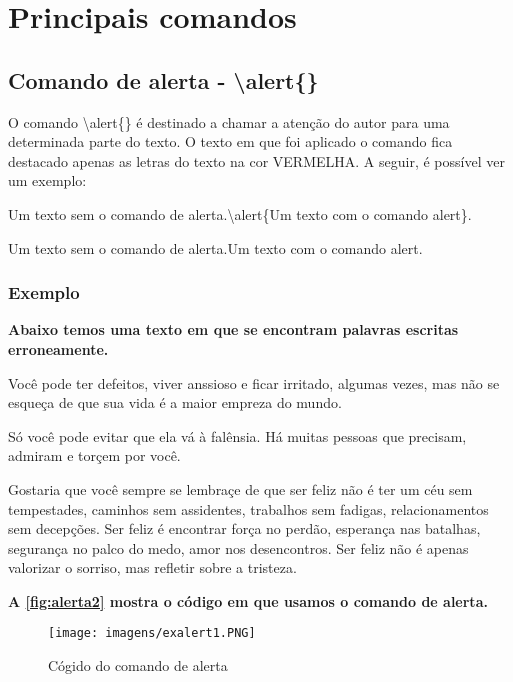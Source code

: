 \documentclass[12pt,openright,oneside,a4paper,sumario=tradicional,brazil]{abntex2}
\begin{document}
\chapter{Principais comandos}

\section{Comando de alerta - \textbackslash alert\{\}}
O comando \textbackslash alert\{\} é destinado a chamar a atenção do autor para uma determinada parte do texto. O texto em que foi aplicado o comando fica destacado apenas as letras do texto na cor \alert{VERMELHA}. A seguir, é possível ver um exemplo:\\

\begin{minipage}{0.45\textwidth}
Um texto sem o comando de alerta.\textbackslash alert\{Um texto com o comando alert\}.
\end{minipage}\hfill
\begin{minipage}{0.45\textwidth}
Um texto sem o comando de alerta.\alert{Um texto com o comando alert}.
\end{minipage}


\subsection{Exemplo}

\textbf{Abaixo temos uma texto em que se encontram palavras escritas erroneamente.}

\begin{center}
\justifying
Você pode ter defeitos, viver anssioso e ficar irritado, algumas vezes, mas não se esqueça de que sua vida é a maior empreza do mundo.

Só você pode evitar que ela vá à falênsia. Há muitas pessoas que precisam, admiram e torçem por você.

Gostaria que você sempre se lembraçe de que ser feliz não é ter um céu sem tempestades, caminhos sem assidentes, trabalhos sem fadigas, relacionamentos sem decepções. Ser feliz é encontrar força no perdão, esperança nas batalhas, segurança no palco do medo, amor nos desencontros. Ser feliz não é apenas valorizar o sorriso, mas refletir sobre a tristeza.
\end{center}

\noindent \textbf{A \autoref{fig:alerta2} mostra o código em que usamos o comando de alerta.}

\begin{figure}[htp]
\caption{Cógido do comando de alerta}
        \centering
        \texttt{[image: imagens/exalert1.PNG]}
\label{fig:alerta2}
\end{figure}
\end{document}
